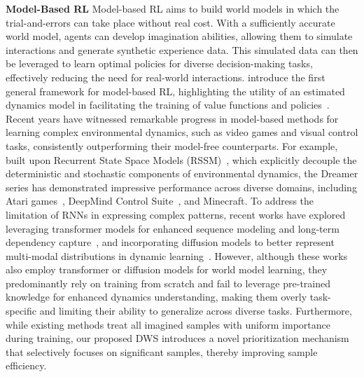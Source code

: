 \noindent \textbf{Model-Based RL}
Model-based RL aims to build world models in which the trial-and-errors can take place without real cost. With a sufficiently accurate world model, agents can develop imagination abilities, allowing them to simulate interactions and generate synthetic experience data. This simulated data can then be leveraged to learn optimal policies for diverse decision-making tasks, effectively reducing the need for real-world interactions. \citet{sutton1991dyna} introduce the first general framework for model-based RL, highlighting the utility of an estimated dynamics model in facilitating the training of value functions and policies~\citep{Sutton1998ReinforcementL}. Recent years have witnessed remarkable progress in model-based methods for learning complex environmental dynamics, such as video games and visual control tasks, consistently outperforming their model-free counterparts. For example, built upon Recurrent State Space Models (RSSM)~\citep{hafner2019PlaNet}, which explicitly decouple the deterministic and stochastic components of environmental dynamics, the Dreamer series has demonstrated impressive performance across diverse domains, including Atari games~\citep{atari}, DeepMind Control Suite~\citep{tassa2018deepmind}, and Minecraft. 
To address the limitation of RNNs in expressing complex patterns, recent works have explored leveraging transformer models for enhanced sequence modeling and long-term dependency capture~\citep{micheli2023iris,robine2023twm,zhang2023storm,zhang2024marie}, and incorporating diffusion models to better represent multi-modal distributions in dynamic learning~\citep{ding2024dwm,alonso2024diamond}. However, although these works also employ transformer or diffusion models for world model learning, they predominantly rely on training from scratch and fail to leverage pre-trained knowledge for enhanced dynamics understanding, making them overly task-specific and limiting their ability to generalize across diverse tasks. Furthermore, while existing methods treat all imagined samples with uniform importance during training, our proposed DWS introduces a novel prioritization mechanism that selectively focuses on significant samples, thereby improving sample efficiency. 
\vspace{-0.5em}